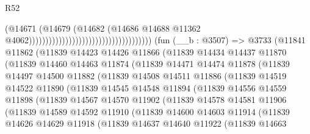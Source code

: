 \begin{lexlean}{R52}
\begin{coremodule}
                                                                      (@14671
                                                                        (@14679
                                                                          (@14682
                                                                            (@14686
                                                                              @14688
                                                                              @11362
                                                                              @4062)))))))))))))))))))))))))))))))))))))
    (fun (__b : @3507) =>
    @3733
      (@11841
        @11862
        (@11839
          @14423
          @14426
          @11866
          (@11839
            @14434
            @14437
            @11870
            (@11839
              @14460
              @14463
              @11874
              (@11839
                @14471
                @14474
                @11878
                (@11839
                  @14497
                  @14500
                  @11882
                  (@11839
                    @14508
                    @14511
                    @11886
                    (@11839
                      @14519
                      @14522
                      @11890
                      (@11839
                        @14545
                        @14548
                        @11894
                        (@11839
                          @14556
                          @14559
                          @11898
                          (@11839
                            @14567
                            @14570
                            @11902
                            (@11839
                              @14578
                              @14581
                              @11906
                              (@11839
                                @14589
                                @14592
                                @11910
                                (@11839
                                  @14600
                                  @14603
                                  @11914
                                  (@11839
                                    @14626
                                    @14629
                                    @11918
                                    (@11839
                                      @14637
                                      @14640
                                      @11922
                                      (@11839
                                        @14663

\end{coremodule}
\end{lexlean}

